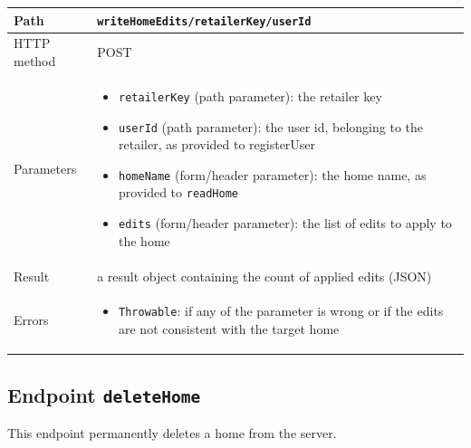\documentclass[a4paper]{report}
\begin{document}
\begin{center}
\begin{tabularx} {\textwidth} { | l | X | }

\hline

Path & \texttt{writeHomeEdits/retailerKey/userId} \\

\hline

HTTP method & POST \\

\hline

Parameters & \begin{itemize}[leftmargin=*,noitemsep,topsep=0px]
\item \texttt{retailerKey} (path parameter): the retailer key
\item \texttt{userId} (path parameter): the user id, belonging to the retailer, as provided to registerUser 
\item \texttt{homeName} (form/header parameter): the home name, as provided to \texttt{readHome}
\item \texttt{edits} (form/header parameter): the list of edits to apply to the home
\end{itemize} \\

\hline

Result & a result object containing the count of applied edits (JSON) \\

\hline

Errors & \begin{itemize}[leftmargin=*,noitemsep,topsep=0px]
\item \texttt{Throwable}: if any of the parameter is wrong or if the edits are not consistent with the target home
\end{itemize} \\

\hline

\end{tabularx}
\end{center}
     
 \subsection{Endpoint \texttt{deleteHome}}

This endpoint permanently deletes a home from the server.
\end{document}
